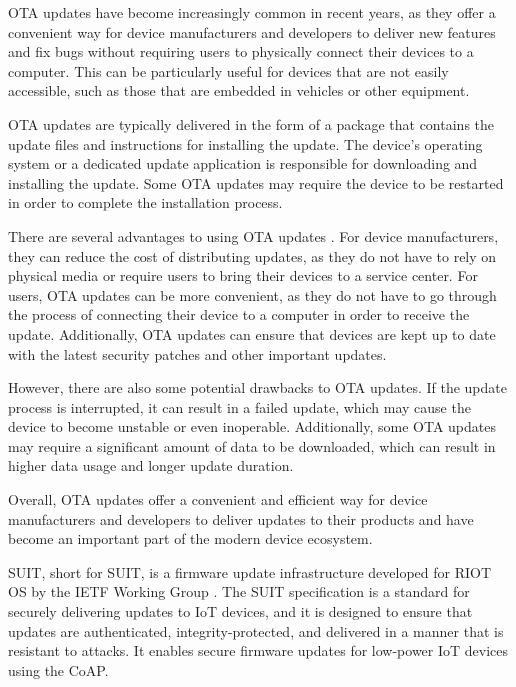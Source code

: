 \acrshort{OTA} updates have become increasingly common in recent years, as they offer a convenient way for device manufacturers and developers to deliver new features and fix bugs without requiring users to physically connect their devices to a computer. This can be particularly useful for devices that are not easily accessible, such as those that are embedded in vehicles or other equipment.

\acrshort{OTA} updates are typically delivered in the form of a package that contains the update files and instructions for installing the update. The device's operating system or a dedicated update application is responsible for downloading and installing the update. Some \acrshort{OTA} updates may require the device to be restarted in order to complete the installation process.

There are several advantages to using \acrshort{OTA} updates \cite{nilsson2008_2}. For device manufacturers, they can reduce the cost of distributing updates, as they do not have to rely on physical media or require users to bring their devices to a service center. For users, \acrshort{OTA} updates can be more convenient, as they do not have to go through the process of connecting their device to a computer in order to receive the update. Additionally, \acrshort{OTA} updates can ensure that devices are kept up to date with the latest security patches and other important updates.

However, there are also some potential drawbacks to \acrshort{OTA} updates. If the update process is interrupted, it can result in a failed update, which may cause the device to become unstable or even inoperable. Additionally, some \acrshort{OTA} updates may require a significant amount of data to be downloaded, which can result in higher data usage and longer update duration.

Overall, \acrshort{OTA} updates offer a convenient and efficient way for device manufacturers and developers to deliver updates to their products and have become an important part of the modern device ecosystem.

\acrshort{SUIT}, short for \acrlong{SUIT}, is a firmware update infrastructure developed for RIOT OS by the IETF Working Group \cite{suit-23}. The \acrshort{SUIT} specification is a standard for securely delivering updates to \acrshort{IoT} devices, and it is designed to ensure that updates are authenticated, integrity-protected, and delivered in a manner that is resistant to attacks. It enables secure firmware updates for low-power \acrshort{IoT} devices using the \acrfull{CoAP}.

